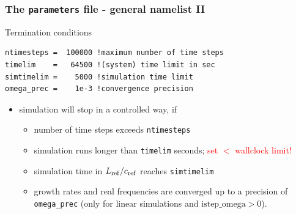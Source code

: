 \documentclass[9pt]{beamer}
\newcommand{\cR}[1]{\textcolor{red}{#1}}
\begin{document}
\begin{frame}[fragile]
  \frametitle{The {\tt parameters} file - general namelist II}

\begin{block}{Termination conditions}

\begin{block}

\begin{verbatim}
ntimesteps =  100000 !maximum number of time steps
timelim    =   64500 !(system) time limit in sec
simtimelim =    5000 !simulation time limit
omega_prec =    1e-3 !convergence precision
\end{verbatim}
\end{block}
\begin{itemize}
\item simulation will stop in a controlled way, if
\begin{itemize}
\item number of time steps exceeds {\tt ntimesteps}
\item simulation runs longer than {\tt timelim} seconds; \cR{set $<$ wallclock limit!}
\item simulation time in $L_{\rm ref}/c_{\rm ref}$ reaches {\tt simtimelim}
\item growth rates and real frequencies are converged up to a
precision of {\tt omega\_prec} (only for linear simulations
and $\textrm{istep\_omega} > 0$).
\end{itemize}
\end{itemize}
\end{block}

\end{frame}

\end{document}
